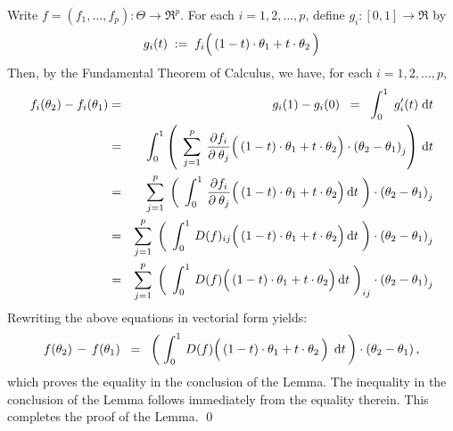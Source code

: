 \proof
Write $f = (f_{1}, \ldots , f_{p}) : \Theta \longrightarrow \Re^{p}$.
For each $i = 1, 2, \ldots, p$, define $g_{i} : [0,1] \longrightarrow \Re$ by
\begin{equation*}
g_{i}(t) \; := \; f_{i}\!\left(\,(1-t)\cdot \theta_{1} \overset{{\color{white}.}}{+} t \cdot \theta_{2}\,\right)
\end{equation*}
Then, by the Fundamental Theorem of Calculus, we have, for each $i = 1, 2, \ldots, p$,
\begin{eqnarray*}
f_{i}(\theta_{2}) - f_{i}(\theta_{1})
& = &
	g_{i}(1) - g_{i}(0)
\;\; = \;\;
	\int_{0}^{1}\; g_{i}^{\prime}(t) \;\d t
\\
& = &
	\int_{0}^{1} \left(\;\,
		\overset{p}{\underset{j=1}{\sum}}\;\,
		\dfrac{\partial f_{i}}{\partial_{{\color{white}.}}\theta_{j}}
		\!\left(\,(1-t)\cdot \theta_{1} \overset{{\color{white}.}}{+} t \cdot \theta_{2}\right)
		\cdot
		\left(\theta_{2} - \theta_{1}\right)_{j}
		\right)\,\d t
\\
& = &
	\overset{p}{\underset{j=1}{\sum}}\;
	\left(\;\,
		\int_{0}^{1}\,
			\dfrac{\partial f_{i}}{\partial_{{\color{white}.}}\theta_{j}}
			\!\left(\,(1-t)\cdot \theta_{1} \overset{{\color{white}.}}{+} t \cdot \theta_{2}\right)
			\d t \;
		\right)
	\cdot
	\left(\theta_{2} - \theta_{1}\right)_{j}
\\
& = &
	\overset{p}{\underset{j=1}{\sum}}\;
	\left(\;\,
		\int_{0}^{1}\,
			D(f)_{ij}
			\!\left(\,(1-t)\cdot \theta_{1} \overset{{\color{white}.}}{+} t \cdot \theta_{2}\right)
			\d t \;
		\right)
	\cdot
	\left(\theta_{2} - \theta_{1}\right)_{j}
\\
& = &
	\overset{p}{\underset{j=1}{\sum}}\;
	\left(\;\,
		\int_{0}^{1}\,
			D(f)
			\!\left(\,(1-t)\cdot \theta_{1} \overset{{\color{white}.}}{+} t \cdot \theta_{2}\right)
			\d t \;
		\right)_{ij}
	\cdot
	\left(\theta_{2} - \theta_{1}\right)_{j}
\end{eqnarray*}
Rewriting the above equations in vectorial form yields:
\begin{equation*}
f(\theta_{2}) \, - \, f(\theta_{1})
\;\; = \;\;
	\left(\;\int_{0}^{1}\, D(f)\!\left(\,(1-t)\cdot \theta_{1} \overset{{\color{white}.}}{+} t \cdot \theta_{2} \,\right) \;\d t\,\right)
	\cdot (\theta_{2} - \theta_{1})\,,
\end{equation*}
which proves the equality in the conclusion of the Lemma.
The inequality in the conclusion of the Lemma follows immediately from the equality therein.
This completes the proof of the Lemma.
\qed


